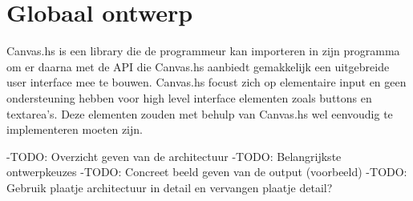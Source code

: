 \section{Globaal ontwerp}  \label{sec:globaal}
Canvas.hs is een library die de programmeur kan importeren in zijn programma om er daarna met de API die Canvas.hs aanbiedt gemakkelijk een uitgebreide user interface mee te bouwen. Canvas.hs focust zich op elementaire input en geen ondersteuning hebben voor high level interface elementen zoals buttons en textarea's. Deze elementen zouden met behulp van Canvas.hs wel eenvoudig te implementeren moeten zijn.

-TODO: Overzicht geven van de architectuur
-TODO: Belangrijkste ontwerpkeuzes
-TODO: Concreet beeld geven van de output (voorbeeld)
-TODO: Gebruik plaatje architectuur in detail en vervangen plaatje detail?